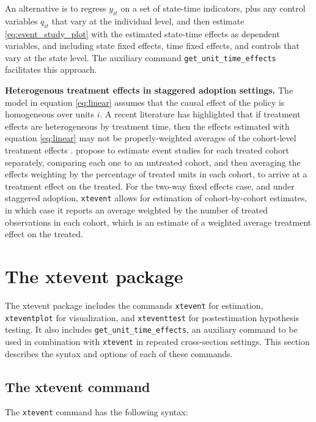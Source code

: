 \documentclass[bib]{./sty/statapress}
\begin{document}
An alternative \citep{amemiya1978note, hansen2007generalized} is to regress $y_{it}$ on a set of state-time indicators, plus any control variables $q_{it}$ that vary at the individual level, and then estimate \eqref{eq:event_study_plot} with the estimated state-time effects as dependent variables, and including state fixed effects, time fixed effects, and controls that vary at the state level.
The auxiliary command \texttt{get\_unit\_time\_effects} facilitates this approach.

\textbf{Heterogenous treatment effects in staggered adoption settings.} The model in equation \eqref{eq:linear} assumes that the causal effect of the policy is homogeneous over units $i$.
A recent literature has highlighted that if treatment effects are heterogeneous by treatment time, then the effects estimated with equation \eqref{eq:linear} may not be properly-weighted averages of the cohort-level treatment effects \citep{athey2022design,callaway2021difference,goodman2021difference,sun2021estimating}.
\cite{sun2021estimating} propose to estimate event studies for each treated cohort separately, comparing each one to an untreated cohort, and then averaging the effects weighting by the percentage of treated units in each cohort, to arrive at a treatment effect on the treated.
For the two-way fixed effects case, and under staggered adoption, \texttt{xtevent} allows for estimation of cohort-by-cohort estimates, in which case it reports an average weighted by the number of treated observations in each cohort, which is an estimate of a weighted average treatment effect on the treated.


\section{The xtevent package}\label{sec:package}
The xtevent package includes the commands \texttt{xtevent} for estimation, \texttt{xteventplot} for visualization, and \texttt{xteventtest} for postestimation hypothesis testing. It also includes \texttt{get\_unit\_time\_effects}, an auxiliary command to be used in combination with \texttt{xtevent} in repeated cross-section settings. This section describes the syntax and options of each of these commands.


\subsection{The xtevent command}
The \texttt{xtevent} command has the following syntax:
\end{document}
